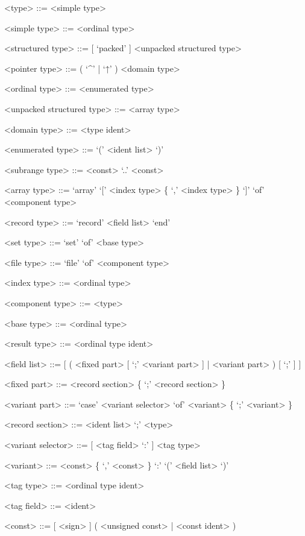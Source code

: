 \documentclass{article}
\begin{document}
{
  \begin{grammar}
    <type> ::= <simple type>  

    <simple type> ::= <ordinal type> 

    <structured type> ::= [ `packed' ] <unpacked structured type> 

    <pointer type> ::= ( `^' | `↑' ) <domain type> 

    <ordinal type> ::= <enumerated type>  

    <unpacked structured type> ::= <array type>   

    <domain type> ::= <type ident>

    <enumerated type> ::= `(' <ident list> `)'

    <subrange type> ::= <const> `..' <const>

    <array type> ::= `array' `[' <index type> \{ `,' <index type> \} `]' `of' <component type>

    <record type> ::= `record' <field list> `end'

    <set type> ::= `set' `of' <base type>

    <file type> ::= `file' `of' <component type>

    <index type> ::= <ordinal type>

    <component type> ::= <type>

    <base type> ::= <ordinal type>

    <result type> ::= <ordinal type ident>  

    <field list> ::= [ ( <fixed part> [ `;' <variant part> ] | <variant part> ) [ `;' ] ]

    <fixed part> ::= <record section> \{ `;' <record section> \}

    <variant part> ::= `case' <variant selector> `of' <variant> \{ `;' <variant> \}

    <record section> ::= <ident list> `;' <type>

    <variant selector> ::= [ <tag field> `:' ] <tag type>

    <variant> ::= <const> \{ `,' <const> \} `:' `(' <field list> `)'

    <tag type> ::= <ordinal type ident>

    <tag field> ::= <ident>

    <const> ::= [ <sign> ] ( <unsigned const> | <const ident> )
  \end{grammar}
}
\end{document}
